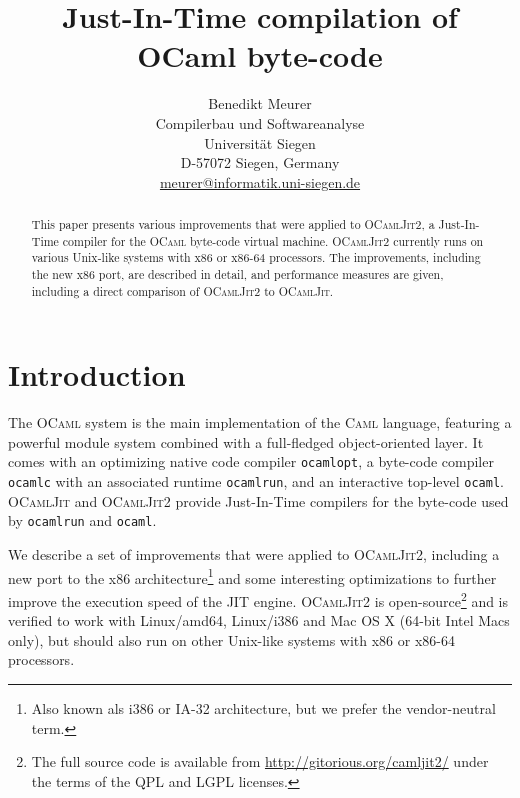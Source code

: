 \documentclass[12pt,a4paper,final]{article}
\begin{document}
\title{%
  Just-In-Time compilation of OCaml byte-code
}
\author{%
  Benedikt Meurer\\
  Compilerbau und Softwareanalyse\\
  Universit\"at Siegen\\
  D-57072 Siegen, Germany\\
  \url{meurer@informatik.uni-siegen.de}
}
\date{}
\maketitle
\begin{abstract}
  This paper presents various improvements that were applied to
  \textsc{OCamlJit2}, a Just-In-Time compiler for the \textsc{OCaml}
  byte-code virtual machine. \textsc{OCamlJit2} currently runs on
  various Unix-like systems with x86 or x86-64 processors. The
  improvements, including the new x86 port, are described in detail,
  and performance measures are given, including a direct
  comparison of \textsc{OCamlJit2} to \textsc{OCamlJit}.
\end{abstract}


\section{Introduction}

The \textsc{OCaml} system \cite{Leroy10,Remy02} is the main implementation of the
\textsc{Caml} language, featuring a powerful module system combined with a full-fledged
object-oriented layer. It comes with an optimizing native code compiler \texttt{ocamlopt},
a byte-code compiler \texttt{ocamlc} with an associated runtime \texttt{ocamlrun}, and
an interactive top-level \texttt{ocaml}.
\textsc{OCamlJit} \cite{Starynkevitch04} and \textsc{OCamlJit2} \cite{Meurer10:OCamlJit2.0}
provide Just-In-Time compilers for the byte-code used by \texttt{ocamlrun} and
\texttt{ocaml}.

We describe a set of improvements that were applied to \textsc{OCamlJit2},
including a new port to the x86 architecture\footnote{Also known als i386 or IA-32 architecture,
but we prefer the vendor-neutral term.} and some interesting optimizations to further
improve the execution speed of the JIT engine. \textsc{OCamlJit2} is open-source\footnote{The
full source code is available from \url{http://gitorious.org/camljit2/} under the terms of
the QPL and LGPL licenses.} and is verified to work with Linux/amd64, Linux/i386 and Mac OS X
(64-bit Intel Macs only), but should also run on other Unix-like systems with x86 or x86-64
processors.
\end{document}

